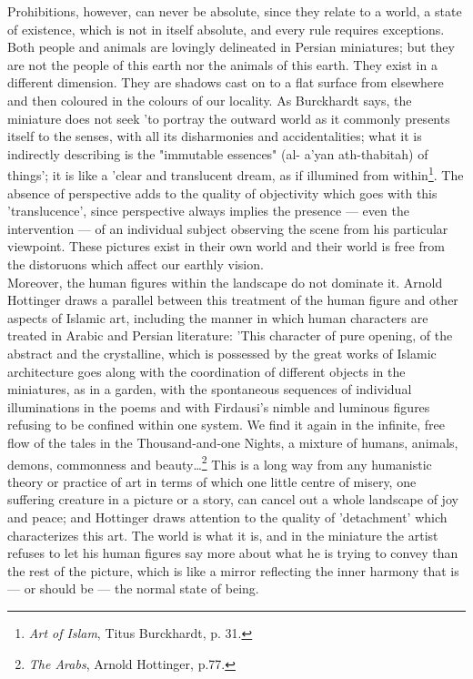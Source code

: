 \documentclass[11pt, b5paper, twoside]{book}
\begin{document}
Prohibitions, however, can never be absolute, since they relate to a world, a state of existence, 
which is not in itself absolute, and every rule requires exceptions. Both people and animals are 
lovingly delineated in Persian miniatures; but they are not the people of this earth nor the animals 
of this earth. They exist in a different dimension. They are shadows cast on to a flat surface from 
elsewhere and then coloured in the colours of our locality. As Burckhardt says, the miniature does 
not seek 'to portray the outward world as it commonly presents itself to the senses, with all its 
disharmonies and accidentalities; what it is indirectly describing is the "immutable essences" (al-
a'yan ath-thabitah) of things'; it is like a 'clear and translucent dream, as if illumined from 
within\footnote{\emph{Art of Islam}, Titus Burckhardt, p. 31.}. The absence of perspective adds to the quality of objectivity which goes with this 
'translucence', since perspective always implies the presence --- even the intervention --- of an 
individual subject observing the scene from his particular viewpoint. These pictures exist in their 
own world and their world is free from the distoruons which affect our earthly vision. \\

Moreover, the human figures within the landscape do not dominate it. Arnold Hottinger draws a 
parallel between this treatment of the human figure and other aspects of Islamic art, including the 
manner in which human characters are treated in Arabic and Persian literature: 'This character of 
pure opening, of the abstract and the crystalline, which is possessed by the great works of Islamic 
architecture goes along with the coordination of different objects in the miniatures, as in a garden, 
with the spontaneous sequences of individual illuminations in the poems and with Firdausi's nimble 
and luminous figures refusing to be confined within one system. We find it again in the infinite, 
free flow of the tales in the Thousand-and-one Nights, a mixture of humans, animals, demons, 
commonness and beauty\ldots{}\footnote{\emph{The Arabs}, Arnold Hottinger, p.77.} This is a long way from any humanistic theory or practice of art in 
terms of which one little centre of misery, one suffering creature in a picture or a story, can 
cancel out a whole landscape of joy and peace; and Hottinger draws attention to the quality of 
'detachment' which characterizes this art. The world is what it is, and in the miniature the artist 
refuses to let his human figures say more about what he is trying to convey than the rest of the 
picture, which is like a mirror reflecting the inner harmony that is --- or should be --- the normal 
state of being. \\
\end{document}
